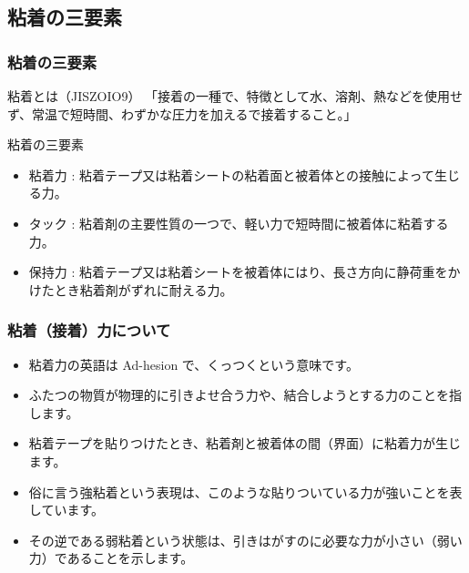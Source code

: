 \documentclass[unicode,12pt]{beamer}%
\begin{document}
\subsection{粘着の三要素}
\begin{frame}
	\frametitle{粘着の三要素}
	\begin{block}{粘着とは（JISZOIO9）}
		「接着の一種で、特徴として水、溶剤、熱などを使用せず、常温で短時間、わずかな圧力を加えるで接着すること。」
	\end{block}
	\begin{exampleblock}{粘着の三要素}
		\begin{itemize}
			\item 粘着力 : 粘着テープ又は粘着シートの粘着面と被着体との接触によって生じる力。\\
			\item タック : 粘着剤の主要性質の一つで、軽い力で短時間に被着体に粘着する力。
			\item 保持力 : 粘着テープ又は粘着シートを被着体にはり、長さ方向に静荷重をかけたとき粘着剤がずれに耐える力。
		\end{itemize}
	\end{exampleblock}
\end{frame}

\begin{frame}
	\frametitle{粘着（接着）力について}
	\begin{itemize}
		\item 粘着力の英語は Ad-hesion で、くっつくという意味です。
		\item ふたつの物質が物理的に引きよせ合う力や、結合しようとする力のことを指します。
		\item 粘着テープを貼りつけたとき、粘着剤と被着体の間（界面）に粘着力が生じます。
		\item 俗に言う強粘着という表現は、このような貼りついている力が強いことを表しています。
		\item その逆である弱粘着という状態は、引きはがすのに必要な力が小さい（弱い力）であることを示します。
	\end{itemize}
\end{frame}
\end{document}
